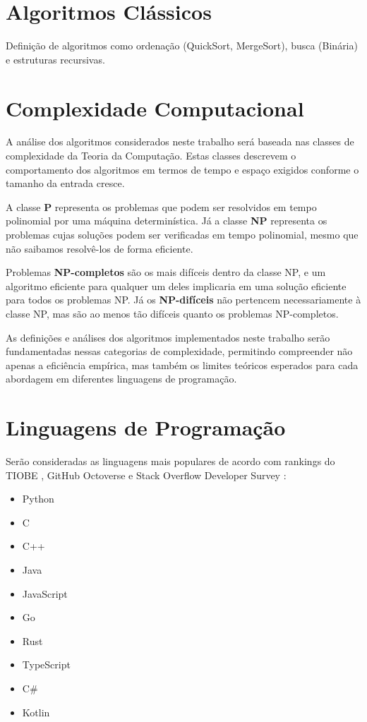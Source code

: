 \documentclass[12pt,oneside,a4paper]{report}
\begin{document}
\section{Algoritmos Clássicos}
Definição de algoritmos como ordenação (QuickSort, MergeSort), busca (Binária) e estruturas recursivas.

\section{Complexidade Computacional}
A análise dos algoritmos considerados neste trabalho será baseada nas classes de complexidade da Teoria da Computação. Estas classes descrevem o comportamento dos algoritmos em termos de tempo e espaço exigidos conforme o tamanho da entrada cresce.

A classe \textbf{P} representa os problemas que podem ser resolvidos em tempo polinomial por uma máquina determinística. Já a classe \textbf{NP} representa os problemas cujas soluções podem ser verificadas em tempo polinomial, mesmo que não saibamos resolvê-los de forma eficiente.

Problemas \textbf{NP-completos} são os mais difíceis dentro da classe NP, e um algoritmo eficiente para qualquer um deles implicaria em uma solução eficiente para todos os problemas NP. Já os \textbf{NP-difíceis} não pertencem necessariamente à classe NP, mas são ao menos tão difíceis quanto os problemas NP-completos.

As definições e análises dos algoritmos implementados neste trabalho serão fundamentadas nessas categorias de complexidade, permitindo compreender não apenas a eficiência empírica, mas também os limites teóricos esperados para cada abordagem em diferentes linguagens de programação.

\section{Linguagens de Programação}
Serão consideradas as linguagens mais populares de acordo com rankings do TIOBE \cite{tiobe}, GitHub Octoverse \cite{octoverse} e Stack Overflow Developer Survey \cite{stackoverflow}:

\begin{itemize}
    \item Python
    \item C
    \item C++
    \item Java
    \item JavaScript
    \item Go
    \item Rust
    \item TypeScript
    \item C\#
    \item Kotlin
\end{itemize}
\end{document}
